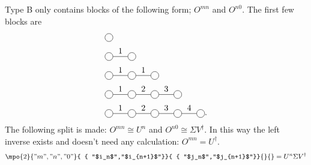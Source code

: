 Type B only contains blocks of the following form; $O^{m n}$ and $O^{n 0}$. The first few blocks are
\begin{equation}
  \begin{split}
    &\mpob{1}{ {,}  }{}{}{}{{,,}} \\
    &\mpob{2}{ {,"1",}  }{}{}{}{{,,}}\\
    &\mpob{3}{ {,"1","1",}  }{}{}{}{{,,,}}\\
    &\mpob{4}{ {,"1","2","3",}  }{}{}{}{{,,,,,}}\\
    &\mpob{5}{ {,"1","2","3","4",}  }{}{}{}{{,,,,,}}.
  \end{split}
\end{equation}
The following split is made: $O^{m n} \cong U^n$ and $O^{n 0} \cong  \Sigma V^{\dagger}$. In this way the left inverse exists and doesn't need any calculation: $O^{m n} = U^{\dagger}$.
\def \rhs{\expH{2}{ $L_{m}^{-1}  M_{n+1} $ }{{"$i_n$","$i_{n+1}$"}}{{"$j_n$","$j_{n+1}$"}}{{"m","0"}}  }
\begin{equation}
  \begin{split}
    \mpo{2}{ {"m","n","0"}  }{ { "$i_n$","$i_{n+1}$"}}{ { "$j_n$","$j_{n+1}$"}}{}{} =  U^n  \Sigma V^{\dagger}\\
  \end{split}
\end{equation}

